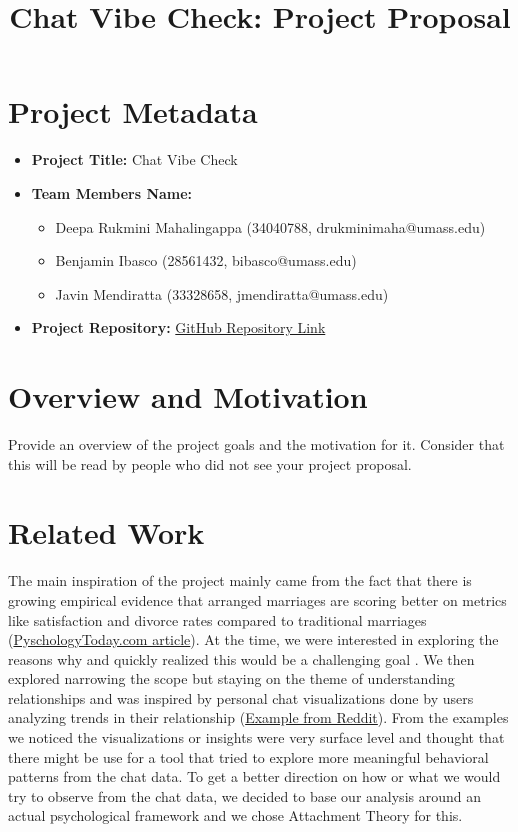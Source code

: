 \documentclass{article}\usepackage{graphicx}
\title{\textbf{Chat Vibe Check: Project Proposal}}
\begin{document}
\maketitle

\section{Project Metadata}
\begin{itemize}
    \item \textbf{Project Title:} Chat Vibe Check
    \item \textbf{Team Members Name:} 
    \begin{itemize}
        \item Deepa Rukmini Mahalingappa (34040788, drukminimaha@umass.edu)
        \item Benjamin Ibasco (28561432, bibasco@umass.edu)
        \item Javin Mendiratta (33328658, jmendiratta@umass.edu)
    \end{itemize}
   
    \item \textbf{Project Repository:} \href{https://github.com/bibascoumass/chat-vibe-check}{GitHub Repository Link}
\end{itemize}

\section*{Overview and Motivation}
Provide an overview of the project goals and the motivation for it. Consider that this will be read by people who did not see your project proposal.

\section*{Related Work}
The main inspiration of the project mainly came from the fact that there is growing empirical evidence that arranged marriages are scoring better on metrics like satisfaction and divorce rates compared to traditional marriages (\href{https://www.psychologytoday.com/us/blog/the-science-behind-behavior/201511/why-are-so-many-indian-arranged-marriages-successful}{PyschologyToday.com article}). At the time, we were interested in exploring the reasons why and quickly realized this would be a challenging goal . We then explored narrowing the scope but staying on the theme of understanding relationships and was inspired by personal chat visualizations done by users analyzing trends in their relationship (\href{https://github.com/bibascoumass/chat-vibe-check}{Example from Reddit}). From the examples we noticed the visualizations or insights were very surface level and thought that there might be use for a tool that tried to explore more meaningful behavioral patterns from the chat data. To get a better direction on how or what we would try to observe from the chat data, we decided to base our analysis around an actual psychological framework and we chose Attachment Theory for this.  
\end{document}
